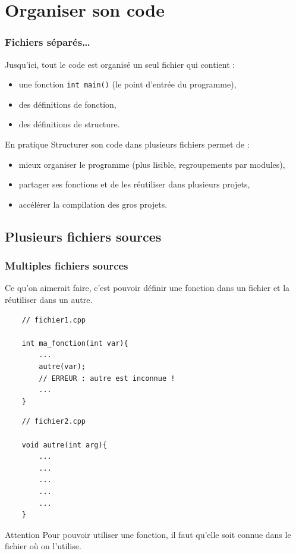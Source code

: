 \section{Organiser son code}

\begin{frame}
\frametitle{Fichiers séparés\dots}

Jusqu'ici, tout le code est organisé un seul fichier qui contient :
\begin{itemize}
    \item une fonction \texttt{int main()} (le point d'entrée du programme),
    \item des définitions de fonction,
    \item des définitions de structure.
\end{itemize}

\begin{block}{En pratique}
Structurer son code dans plusieurs fichiers permet de :
\begin{itemize}
    \item mieux organiser le programme (plus lisible, regroupements par modules),
    \item partager ses fonctions et de les réutiliser dans plusieurs projets,
    \item accélérer la compilation des gros projets.
\end{itemize}
\end{block}
\end{frame}

\subsection{Plusieurs fichiers sources}

\begin{frame}[fragile=singleslide]
\frametitle{Multiples fichiers sources}
Ce qu'on aimerait faire, c'est pouvoir définir une fonction dans un fichier et la réutiliser dans un autre.

  \begin{minipage}{0.49\textwidth}
      \begin{verbatim}
    // fichier1.cpp
    
    int ma_fonction(int var){
        ...
        autre(var);
        // ERREUR : autre est inconnue !
        ...
    }
    \end{verbatim}
  \end{minipage}%
  \begin{minipage}{0.49\textwidth}
    \begin{verbatim}
    // fichier2.cpp
    
    void autre(int arg){
        ...
        ...
        ...
        ...
        ...
    }
    \end{verbatim}
  \end{minipage}
\begin{alertblock}{Attention}
Pour pouvoir utiliser une fonction, il faut qu'elle soit connue dans le fichier où on l'utilise.
\end{alertblock}
\end{frame}

